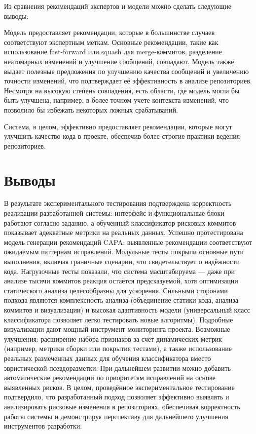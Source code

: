 Из сравнения рекомендаций экспертов и модели можно сделать следующие выводы:

Модель предоставляет рекомендации, которые в большинстве случаев соответствуют экспертным меткам. Основные рекомендации, такие как использование fast-forward или squash для merge-коммитов, разделение неатомарных изменений и улучшение сообщений, совпадают.
Модель также выдает полезные предложения по улучшению качества сообщений и увеличению точности изменений, что подтверждает её эффективность в анализе репозиториев.
Несмотря на высокую степень совпадения, есть области, где модель могла бы быть улучшена, например, в более точном учете контекста изменений, что позволило бы избежать некоторых ложных срабатываний.

Система, в целом, эффективно предоставляет рекомендации, которые могут улучшить качество кода в проекте, обеспечив более строгие практики ведения репозиториев.

\section{Выводы}
В результате экспериментального тестирования подтверждена корректность реализации разработанной системы: интерфейс и функциональные блоки работают согласно заданию, а обученный классификатор рисковых коммитов показывает адекватные метрики на реальных данных. Успешно протестирована модель генерации рекомендаций CAPA: выявленные рекомендации соответствуют ожидаемым паттернам исправлений. Модульные тесты покрыли основные пути выполнения, включая граничные сценарии, что свидетельствует о надёжности кода. Нагрузочные тесты показали, что система масштабируема — даже при анализе тысячи коммитов реакция остаётся предсказуемой, хотя оптимизации статического анализа целесообразны для ускорения. Сильными сторонами подхода являются комплексность анализа (объединение статики кода, анализа коммитов и визуализации) и высокая адаптивность модели (универсальный класс классификатора позволяет легко тестировать новые алгоритмы). Подробные визуализации дают мощный инструмент мониторинга проекта. Возможные улучшения: расширение набора признаков за счёт динамических метрик (например, метрики сборки или покрытия тестами), а также использование реальных размеченных данных для обучения классификатора вместо эвристической псевдоразметки. При дальнейшем развитии можно добавить автоматические рекомендации по приоритетам исправлений на основе выявленных рисков. В целом, проведённое экспериментальное тестирование подтвердило, что разработанный подход позволяет эффективно выявлять и анализировать рисковые изменения в репозиториях, обеспечивая корректность работы системы и демонстрируя перспективу для дальнейшего улучшения инструментов разработки.